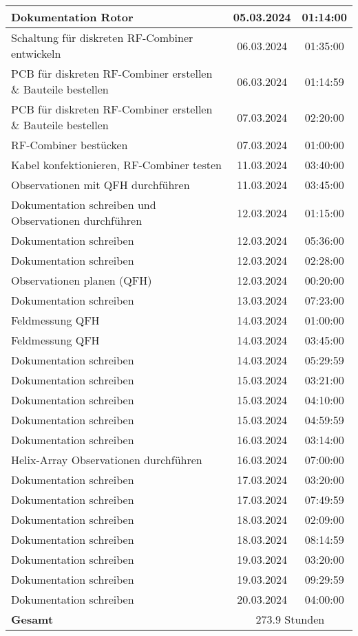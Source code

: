 \begin{longtable}{|l|c|c|}
	\hline
	Dokumentation Rotor & 05.03.2024 & 01:14:00 \\
	\hline
	Schaltung für diskreten RF-Combiner entwickeln  & 06.03.2024 & 01:35:00 \\
	\hline
	PCB für diskreten RF-Combiner erstellen \& Bauteile bestellen & 06.03.2024 & 01:14:59 \\
	\hline
	PCB für diskreten RF-Combiner erstellen \& Bauteile bestellen & 07.03.2024 & 02:20:00 \\
	\hline
	RF-Combiner bestücken & 07.03.2024 & 01:00:00 \\
	\hline
	Kabel konfektionieren, RF-Combiner testen & 11.03.2024 & 03:40:00 \\
	\hline
	Observationen mit QFH durchführen & 11.03.2024 & 03:45:00 \\
	\hline
	Dokumentation schreiben und Observationen durchführen & 12.03.2024 & 01:15:00 \\
	\hline
	Dokumentation schreiben & 12.03.2024 & 05:36:00 \\
	\hline
	Dokumentation schreiben & 12.03.2024 & 02:28:00 \\
	\hline
	Observationen planen (QFH) & 12.03.2024 & 00:20:00 \\
	\hline
	Dokumentation schreiben & 13.03.2024 & 07:23:00 \\
	\hline
	Feldmessung QFH & 14.03.2024 & 01:00:00 \\
	\hline
	Feldmessung QFH & 14.03.2024 & 03:45:00 \\
	\hline
	Dokumentation schreiben & 14.03.2024 & 05:29:59 \\
	\hline
	Dokumentation schreiben & 15.03.2024 & 03:21:00 \\
	\hline
	Dokumentation schreiben & 15.03.2024 & 04:10:00 \\
	\hline
	Dokumentation schreiben & 15.03.2024 & 04:59:59 \\
	\hline
	Dokumentation schreiben & 16.03.2024 & 03:14:00 \\
	\hline
	Helix-Array Observationen durchführen & 16.03.2024 & 07:00:00 \\
	\hline
	Dokumentation schreiben & 17.03.2024 & 03:20:00 \\
	\hline
	Dokumentation schreiben & 17.03.2024 & 07:49:59 \\
	\hline
	Dokumentation schreiben & 18.03.2024 & 02:09:00 \\
	\hline
	Dokumentation schreiben & 18.03.2024 & 08:14:59 \\
	\hline
	Dokumentation schreiben & 19.03.2024 & 03:20:00 \\
	\hline
	Dokumentation schreiben & 19.03.2024 & 09:29:59 \\
	\hline
	Dokumentation schreiben & 20.03.2024 & 04:00:00 \\
	\hhline{|===|}
	\textbf{Gesamt} & \multicolumn{2}{c|}{273.9 Stunden} \\
	\hline
\end{longtable}
